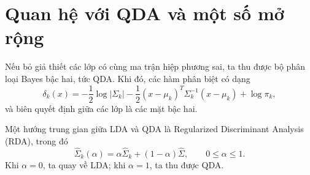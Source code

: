 

\section{Quan hệ với QDA và một số mở rộng}

Nếu bỏ giả thiết các lớp có cùng ma trận hiệp phương sai, ta thu được bộ phân loại Bayes bậc hai, tức QDA. Khi đó, các hàm phân biệt có dạng
\begin{equation}
\delta_k(x)= -\frac12\log |\Sigma_k|
-\frac12(x-\mu_k)^T\Sigma_k^{-1}(x-\mu_k)
+\log \pi_k,
\end{equation}
và biên quyết định giữa các lớp là các mặt bậc hai.

Một hướng trung gian giữa LDA và QDA là Regularized Discriminant Analysis (RDA), trong đó
\begin{equation}
\hat\Sigma_k(\alpha)=\alpha\hat\Sigma_k+(1-\alpha)\hat\Sigma,
\qquad 0\le \alpha \le 1.
\end{equation}
Khi $\alpha=0$, ta quay về LDA; khi $\alpha=1$, ta thu được QDA.
